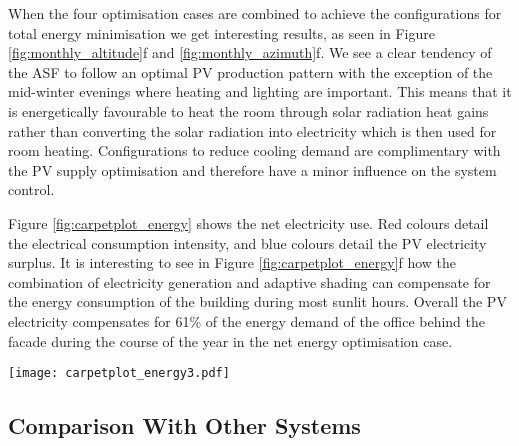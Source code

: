 When the four optimisation cases are combined to achieve the configurations for total energy minimisation we get interesting results, as seen in Figure \ref{fig:monthly_altitude}f and \ref{fig:monthly_azimuth}f. We see a clear tendency of the ASF to follow an optimal PV production pattern with the exception of the mid-winter evenings where heating and lighting are important. This means that it is energetically favourable to heat the room through solar radiation heat gains rather than converting the solar radiation into electricity which is then used for room heating. Configurations to reduce cooling demand are complimentary with the PV supply optimisation and therefore have a minor influence on the system control. 



Figure \ref{fig:carpetplot_energy} shows the net electricity use. Red colours detail the electrical consumption intensity, and blue colours detail the PV electricity surplus. It is interesting to see in Figure \ref{fig:carpetplot_energy}f how the combination of electricity generation and adaptive shading can compensate for the energy consumption of the building during most sunlit hours. Overall the PV electricity compensates for 61\% of the energy demand of the office behind the facade during the course of the year in the net energy optimisation case.

\begin{figure*}
\begin{center}
\texttt{[image: carpetplot\_energy3.pdf]}
\caption{Carpet plots detailing the net energy consumption. Each square represents the total energy consumption for that specific hour of the entire month. Red colours detail net energy consumption, while blue colours detail net energy production.}
\label{fig:carpetplot_energy}
\end{center}
\end{figure*}


\subsection{Comparison With Other Systems}
\label{ch:comparison}

